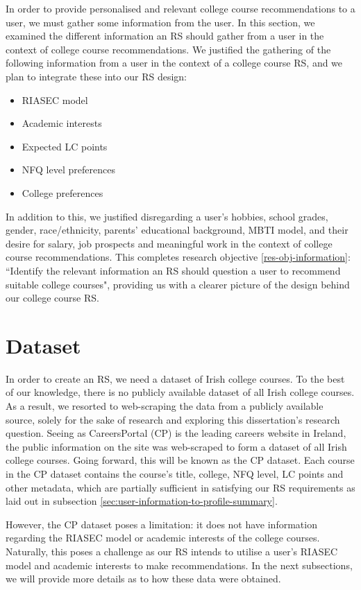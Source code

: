 In order to provide personalised and relevant college course recommendations to a user,
we must gather some information from the user.
In this section, we examined the different information an RS should gather from a user in the context of college course recommendations.
We justified the gathering of the following information from a user in the context of a college course RS, and we plan to integrate these into our RS design:

\begin{itemize}
    \item RIASEC model
    \item Academic interests
    \item Expected LC points
    \item NFQ level preferences
    \item College preferences
\end{itemize}

In addition to this, we justified disregarding a user's hobbies, school grades, gender, race/ethnicity, parents' educational background, MBTI model,
and their desire for salary, job prospects and meaningful work in the context of college course recommendations.
This completes research objective \ref{res-obj-information}: ``Identify the relevant information an RS should question a user to recommend suitable college courses",
providing us with a clearer picture of the design behind our college course RS.

\section{Dataset}

In order to create an RS, we need a dataset of Irish college courses.
To the best of our knowledge, there is no publicly available dataset of all Irish college courses.
As a result, we resorted to web-scraping the data from a publicly available source,
solely for the sake of research and exploring this dissertation's research question.
Seeing as CareersPortal (CP) is the leading careers website in Ireland, 
the public information on the site was web-scraped to form a dataset of all Irish college courses.
Going forward, this will be known as the CP dataset.
Each course in the CP dataset contains the course's title, college, NFQ level, LC points and other metadata, 
which are partially sufficient in satisfying our RS requirements as laid out in subsection \ref{sec:user-information-to-profile-summary}.

However, the CP dataset poses a limitation: it does not have information regarding the RIASEC model or academic interests of the college courses.
Naturally, this poses a challenge as our RS intends to utilise a user's RIASEC model and academic interests to make recommendations.
In the next subsections, we will provide more details as to how these data were obtained.

